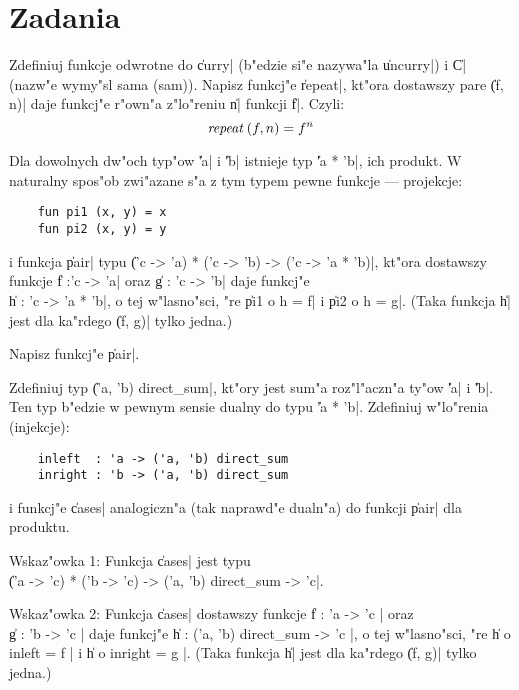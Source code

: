 \section*{Zadania}
\begin{exercises}

\item%
Zdefiniuj funkcje odwrotne do \|curry| (b"edzie si"e nazywa"la \|uncurry|)
i \|C| (nazw"e wymy"sl sama (sam)).
Napisz funkcj"e \|repeat|, kt"ora dostawszy pare \|(f, n)| daje
funkcj"e r"own"a z"lo"reniu \|n| funkcji \|f|. Czyli:
$$ \f{repeat}(f,n) = f^n $$

\item%
Dla dowolnych dw"och typ"ow \|'a| i \|'b| istnieje typ \|'a * 'b|, ich produkt.
W naturalny spos"ob zwi"azane s"a z tym typem pewne funkcje ---
projekcje:
\begin{verbatim}
    fun pi1 (x, y) = x
    fun pi2 (x, y) = y
\end{verbatim}
i funkcja \|pair| typu \|('c -> 'a) * ('c -> 'b) -> ('c -> 'a * 'b)|,
kt"ora dostawszy funkcje \|f :'c -> 'a| oraz \|g : 'c -> 'b| daje funkcj"e\\
 \|h : 'c -> 'a * 'b|, o tej w"lasno"sci, "re
\|pi1 o h = f| i \|pi2 o h = g|. 
(Taka funkcja \|h| jest dla ka"rdego \|(f, g)| tylko jedna.)

Napisz funkcj"e \|pair|.

\item%
Zdefiniuj typ \|('a, 'b) direct_sum|, kt"ory jest sum"a roz"l"aczn"a ty"ow \|'a| i \|'b|.
Ten typ b"edzie w pewnym sensie dualny do typu \|'a * 'b|.
Zdefiniuj w"lo"renia (injekcje):
\begin{verbatim}
    inleft  : 'a -> ('a, 'b) direct_sum 
    inright : 'b -> ('a, 'b) direct_sum
\end{verbatim} 
i funkcj"e \|cases| analogiczn"a (tak naprawd"e dualn"a) do funkcji \|pair| dla produktu.

Wskaz"owka 1:
Funkcja \|cases| jest typu\\
 \|('a -> 'c) * ('b -> 'c) -> ('a, 'b) direct_sum -> 'c|.

Wskaz"owka 2:
Funkcja \|cases| dostawszy funkcje \| f : 'a -> 'c | oraz\\
\| g : 'b -> 'c |
daje funkcj"e \| h : ('a, 'b) direct_sum -> 'c |, o tej w"lasno"sci, "re
\| h o inleft = f | i \| h o inright = g |. 
(Taka funkcja \|h| jest dla ka"rdego \|(f, g)| tylko jedna.)

\pagebreak


\end{exercises}
